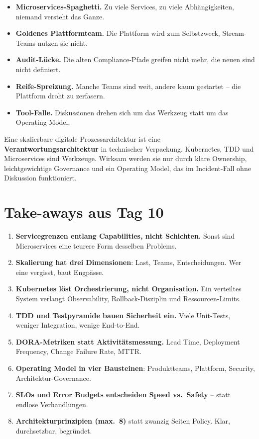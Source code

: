 \documentclass[11pt,a4paper,oneside]{article}
\begin{document}
\begin{itemize}
  \item \textbf{Microservices-Spaghetti.} Zu viele Services, zu viele Abhängigkeiten, niemand versteht das Ganze.
  \item \textbf{Goldenes Plattformteam.} Die Plattform wird zum Selbstzweck, Stream-Teams nutzen sie nicht.
  \item \textbf{Audit-Lücke.} Die alten Compliance-Pfade greifen nicht mehr, die neuen sind nicht definiert.
  \item \textbf{Reife-Spreizung.} Manche Teams sind weit, andere kaum gestartet -- die Plattform droht zu zerfasern.
  \item \textbf{Tool-Falle.} Diskussionen drehen sich um das Werkzeug statt um das Operating Model.
\end{itemize}

\begin{merkbox}
Eine skalierbare digitale Prozessarchitektur ist eine \textbf{Verantwortungsarchitektur} in technischer Verpackung. Kubernetes, TDD und Microservices sind Werkzeuge. Wirksam werden sie nur durch klare Ownership, leichtgewichtige Governance und ein Operating Model, das im Incident-Fall ohne Diskussion funktioniert.
\end{merkbox}

\section{Take-aways aus Tag 10}

\begin{enumerate}
  \item \textbf{Servicegrenzen entlang Capabilities, nicht Schichten.} Sonst sind Microservices eine teurere Form desselben Problems.
  \item \textbf{Skalierung hat drei Dimensionen}: Last, Teams, Entscheidungen. Wer eine vergisst, baut Engpässe.
  \item \textbf{Kubernetes löst Orchestrierung, nicht Organisation.} Ein verteiltes System verlangt Observability, Rollback-Disziplin und Ressourcen-Limits.
  \item \textbf{TDD und Testpyramide bauen Sicherheit ein.} Viele Unit-Tests, weniger Integration, wenige End-to-End.
  \item \textbf{DORA-Metriken statt Aktivitätsmessung.} Lead Time, Deployment Frequency, Change Failure Rate, MTTR.
  \item \textbf{Operating Model in vier Bausteinen}: Produktteams, Plattform, Security, Architektur-Governance.
  \item \textbf{SLOs und Error Budgets entscheiden Speed vs.\ Safety} -- statt endlose Verhandlungen.
  \item \textbf{Architekturprinzipien (max.\ 8)} statt zwanzig Seiten Policy. Klar, durchsetzbar, begründet.
\end{enumerate}
\end{document}
